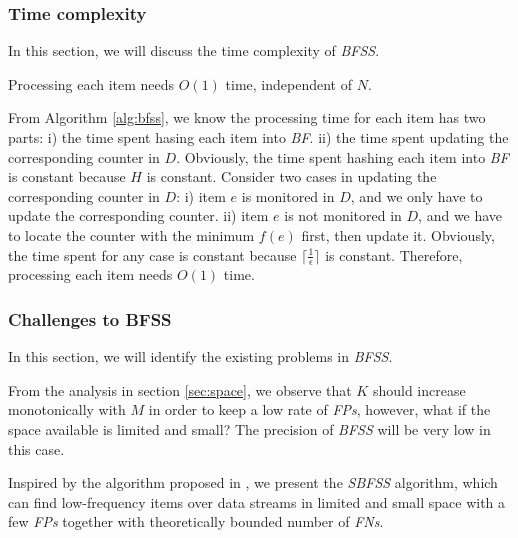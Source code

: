 \documentclass[conference]{IEEEtran}
\begin{document}
\subsubsection{\textbf{Time complexity}}
In this section, we will discuss the time complexity of \emph{BFSS}.

\begin{theorem}\label{thm:5}
Processing each item needs $O(1)$ time, independent of $N$.
\end{theorem}

\begin{IEEEproof}
From Algorithm \ref{alg:bfss}, we know the processing time for each item has two parts: i) the time spent hasing each item into \emph{BF}. ii) the time spent updating the corresponding counter in $D$. Obviously, the time spent hashing each item into \emph{BF} is constant because $H$ is constant. Consider two cases in updating the corresponding counter in $D$: i) item $e$ is monitored in $D$, and we only have to update the corresponding counter. ii) item $e$ is not monitored in $D$, and we have to locate the counter with the minimum $f(e)$ first, then update it. Obviously, the time spent for any case is constant because $\lceil \frac{1}{\epsilon}\rceil$ is constant. Therefore, processing each item needs $O(1)$ time.
\end{IEEEproof}

\subsubsection{\textbf{Challenges to BFSS}}
In this section, we will identify the existing problems in \emph{BFSS}.\par
From the analysis in section \ref{sec:space}, we observe that $K$ should increase monotonically with $M$ in order to keep a low rate of \emph{FPs}, however, what if the space available is limited and small? The precision of \emph{BFSS} will be very low in this case.\par
Inspired by the algorithm proposed in \cite{IEEEexample:sbf}, we present the \emph{SBFSS} algorithm, which can find low-frequency items over data streams in limited and small space with a few \emph{FPs} together with theoretically bounded number of \emph{FNs}.\par
\end{document}
